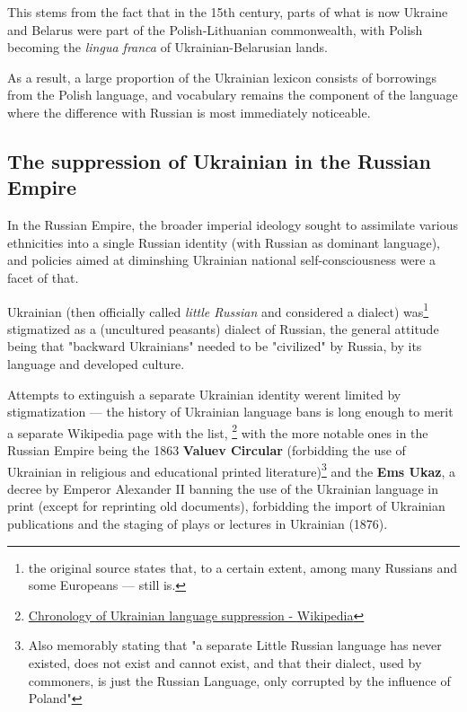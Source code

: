 This stems from the fact that in the 15th century, parts of what is now
Ukraine and Belarus were part of the Polish-Lithuanian commonwealth,
with Polish becoming the \emph{lingua franca} of Ukrainian-Belarusian
lands.

As a result, a large proportion of the Ukrainian lexicon consists of
borrowings from the Polish language, and vocabulary remains the
component of the language where the difference with Russian is most
immediately noticeable. \cite{press2015ukrainian}

\subsection{The suppression of Ukrainian in the Russian
Empire}\label{the-suppression-of-ukrainian-in-the-russian-empire}

In the Russian Empire, the broader imperial ideology sought to
assimilate various ethnicities into a single Russian identity (with
Russian as dominant language), and policies aimed at diminshing
Ukrainian national self-consciousness were a facet of
that.\cite{doi:10.1016/j.euras.2014.05.005}

Ukrainian (then officially called \emph{little Russian}
\cite{press2015ukrainian} and considered a dialect) was\footnote{the
  original source\cite{doi:10.1016/j.euras.2014.05.005} states that, to
  a certain extent, among many Russians and some Europeans --- still is.}
 stigmatized as a (uncultured
peasants\textquotesingle) dialect of Russian,
the general attitude being that
"backward Ukrainians" needed to be "civilized" by Russia, by its
language and developed culture.\cite{doi:10.1016/j.euras.2014.05.005}

Attempts to extinguish a separate Ukrainian identity
weren\textquotesingle t limited by stigmatization --- the history of
Ukrainian language bans is long enough to merit a separate Wikipedia
page with the list, \footnote{\href{https://en.wikipedia.org/wiki/Chronology_of_Ukrainian_language_suppression}{Chronology
  of Ukrainian language suppression - Wikipedia}}
  with the more notable ones
in the Russian Empire being the 1863 \textbf{Valuev Circular}
(forbidding the use of Ukrainian in religious and educational printed
literature)\footnote{Also memorably stating that "a separate Little
  Russian language has never existed, does not exist and cannot exist,
  and that their dialect, used by commoners, is just the Russian
  Language, only corrupted by the influence of
  Poland"\cite{enwikisource:13111073}}\cite{dibrova2017valuev} and the \textbf{Ems
Ukaz}, a decree by Emperor Alexander II banning the use of the Ukrainian
language in print (except for reprinting old documents), forbidding the
import of Ukrainian publications and the staging of plays or lectures in
Ukrainian (1876)\cite{remy2017despite}.

